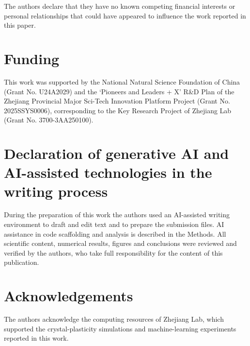 \documentclass[preprint,12pt]{elsarticle}
\begin{document}
The authors declare that they have no known competing financial interests or personal relationships that could have appeared to influence the work reported in this paper.

\section*{Funding}

This work was supported by the National Natural Science Foundation of China (Grant No. U24A2029) and the `Pioneers and Leaders + X' R\&D Plan of the Zhejiang Provincial Major Sci-Tech Innovation Platform Project (Grant No. 2025SSYS0006), corresponding to the Key Research Project of Zhejiang Lab (Grant No. 3700-3AA250100).

\section*{Declaration of generative AI and AI-assisted technologies in the writing process}
During the preparation of this work the authors used an AI-assisted writing environment to draft and edit text and to prepare the submission files. AI assistance in code scaffolding and analysis is described in the Methods. All scientific content, numerical results, figures and conclusions were reviewed and verified by the authors, who take full responsibility for the content of this publication.
\section*{Acknowledgements}

The authors acknowledge the computing resources of Zhejiang Lab, which supported the crystal-plasticity simulations and machine-learning experiments reported in this work.
\end{document}
